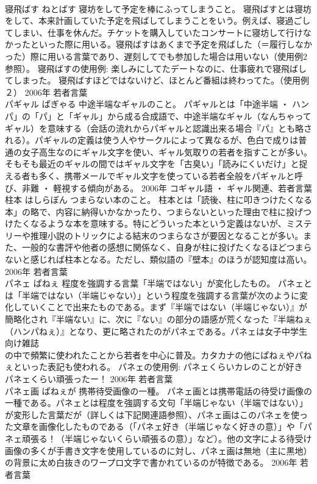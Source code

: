 \documentclass[8pt]{extreport}
\begin{document}
\begin{CJK}{UTF8}{min}
\\	寝飛ばす	ねとばす	寝坊をして予定を棒にふってしまうこと。	寝飛ばすとは寝坊をして、本来計画していた予定を飛ばしてしまうことをいう。例えば、寝過ごしてしまい、仕事を休んだ。チケットを購入していたコンサートに寝坊して行けなかったといった際に用いる。寝飛ばすはあくまで予定を飛ばした（＝履行しなかった）際に用いる言葉であり、遅刻してでも参加した場合は用いない（使用例2参照）。 寝飛ばすの使用例: 楽しみにしてたデートなのに、仕事疲れで寝飛ばしてしまった。 寝飛ばすほどではないけど、ほとんど番組は終わってた。（使用例２）	2006年	若者言葉	
\\	パギャル	ぱぎゃる	中途半端なギャルのこと。	パギャルとは「中途半端 ・ ハンパ」の「パ」と「ギャル」から成る合成語で、中途半端なギャル（なんちゃってギャル）を意味する（会話の流れからパギャルと認識出来る場合『パ』とも略される）。パギャルの定義は使う人やサークルによって異なるが、色白で成りは普通の女子高生なのにギャル文字を使い、ギャル気取りの若者を指すことが多い。そもそも最近のギャルの間ではギャル文字を「古臭い」「読みにくいだけ」と捉える者も多く、携帯メールでギャル文字を使っている若者全般をパギャルと呼び、非難 ・ 軽視する傾向がある。	2006年	コギャル語 ・ ギャル関連、若者言葉	
\\	柱本	はしらぼん	つまらない本のこと。	柱本とは「読後、柱に叩きつけたくなる本」の略で、内容に納得いかなかったり、つまらないといった理由で柱に投げつけたくなるような本を意味する。特にどういった本という定義はないが、ミステリーや推理小説のトリックによる結末のつまらなさが要因となることが多い。また、一般的な書評や他者の感想に関係なく、自身が柱に投げたくなるほどつまらないと感じれば柱本となる。ただし、類似語の『壁本』のほうが認知度は高い。	2006年	若者言葉	
\\	パネェ	ぱねぇ	程度を強調する言葉「半端ではない」が変化したもの。	パネェとは「半端ではない（半端じゃない）」という程度を強調する言葉が次のように変化していくことで出来たものである。まず『半端ではない（半端じゃない）』が簡略化され『半端ない』に、次に『ない』の部分の語感が荒くなった『半端ねぇ（ハンパねぇ）』となり、更に略されたのがパネェである。パネェは女子中学生向け雑誌
\\	の中で頻繁に使われたことから若者を中心に普及。カタカナの他にぱねぇやパねぇといった表記も使われる。 パネェの使用例: パネェくらいカレのことが好き パネェくらい頑張ったー！	2006年	若者言葉	
\\	パネェ画	ぱねぇが	携帯待受画像の一種。	パネェ画とは携帯電話の待受け画像の一種である。パネェとは程度を強調する文句「半端じゃない（半端ではない）」が変形した言葉だが（詳しくは下記関連語参照）、パネェ画はこのパネェを使った文章を画像化したものである（「パネェ好き（半端じゃなく好きの意）」や「パネェ頑張る！（半端じゃないくらい頑張るの意）」など）。他の文字による待受け画像の多くが手書き文字を使用しているのに対し、パネェ画は無地（主に黒地）の背景に太め白抜きのワープロ文字で書かれているのが特徴である。	2006年	若者言葉	

\end{CJK}
\end{document}
